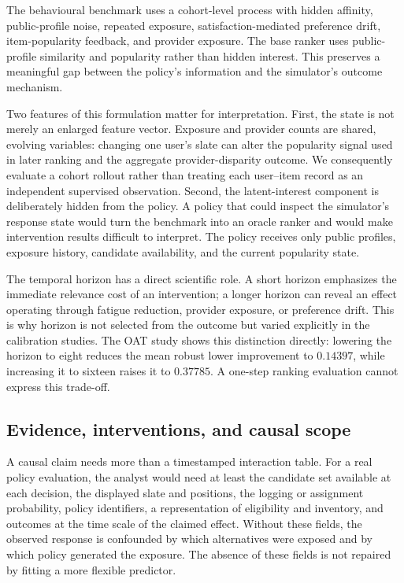\documentclass[review]{elsarticle}
\theoremstyle{plain}
\theoremstyle{definition}
\theoremstyle{remark}
\begin{document}
The behavioural benchmark uses a cohort-level process with hidden affinity, public-profile noise, repeated exposure, satisfaction-mediated preference drift, item-popularity feedback, and provider exposure. The base ranker uses public-profile similarity and popularity rather than hidden interest. This preserves a meaningful gap between the policy's information and the simulator's outcome mechanism.

Two features of this formulation matter for interpretation. First, the state is not merely an enlarged feature vector. Exposure and provider counts are shared, evolving variables: changing one user's slate can alter the popularity signal used in later ranking and the aggregate provider-disparity outcome. We consequently evaluate a cohort rollout rather than treating each user--item record as an independent supervised observation. Second, the latent-interest component is deliberately hidden from the policy. A policy that could inspect the simulator's response state would turn the benchmark into an oracle ranker and would make intervention results difficult to interpret. The policy receives only public profiles, exposure history, candidate availability, and the current popularity state.

The temporal horizon has a direct scientific role. A short horizon emphasizes the immediate relevance cost of an intervention; a longer horizon can reveal an effect operating through fatigue reduction, provider exposure, or preference drift. This is why horizon is not selected from the outcome but varied explicitly in the calibration studies. The OAT study shows this distinction directly: lowering the horizon to eight reduces the mean robust lower improvement to $0.14397$, while increasing it to sixteen raises it to $0.37785$. A one-step ranking evaluation cannot express this trade-off.

\subsection{Evidence, interventions, and causal scope}

A causal claim needs more than a timestamped interaction table. For a real policy evaluation, the analyst would need at least the candidate set available at each decision, the displayed slate and positions, the logging or assignment probability, policy identifiers, a representation of eligibility and inventory, and outcomes at the time scale of the claimed effect. Without these fields, the observed response is confounded by which alternatives were exposed and by which policy generated the exposure. The absence of these fields is not repaired by fitting a more flexible predictor.
\end{document}
